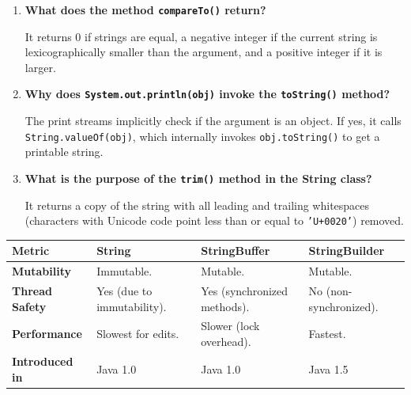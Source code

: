 \documentclass[12pt,a4paper]{article}
\newcommand{\Q}[1]{\textbf{#1}\par\noindent\ignorespaces}
\renewcommand{\arraystretch}{1.45}
\begin{document}
\begin{tcolorbox}[exambox, title={\textbf{Frequently Asked / Viva Questions}}]
\begin{enumerate}[leftmargin=*, label=\textbf{Q\arabic*.}, itemsep=5pt]
  \item \Q{What does the method \texttt{compareTo()} return?}
        It returns $0$ if strings are equal, a negative integer if the current string is lexicographically smaller than the argument, and a positive integer if it is larger.
        
  \item \Q{Why does \texttt{System.out.println(obj)} invoke the \texttt{toString()} method?}
        The print streams implicitly check if the argument is an object. If yes, it calls \texttt{String.valueOf(obj)}, which internally invokes \texttt{obj.toString()} to get a printable string.
        
  \item \Q{What is the purpose of the \texttt{trim()} method in the String class?}
        It returns a copy of the string with all leading and trailing whitespaces (characters with Unicode code point less than or equal to \texttt{'U+0020'}) removed.
\end{enumerate}
\end{tcolorbox}

\begin{tcolorbox}[tikzbox, title={Comparison: String vs. StringBuffer vs. StringBuilder}]
\centering
{\renewcommand{\arraystretch}{1.45}%
\begin{tabularx}{\linewidth}{|B{2.8cm}|Y|Y|Y|}
\hline
\textbf{Metric} & \textbf{String} & \textbf{StringBuffer} & \textbf{StringBuilder} \\
\hline
\textbf{Mutability} & Immutable. & Mutable. & Mutable. \\
\hline
\textbf{Thread Safety} & Yes (due to immutability). & Yes (synchronized methods). & No (non-synchronized). \\
\hline
\textbf{Performance} & Slowest for edits. & Slower (lock overhead). & Fastest. \\
\hline
\textbf{Introduced in} & Java 1.0 & Java 1.0 & Java 1.5 \\
\hline
\end{tabularx}}
\end{tcolorbox}
\end{document}
